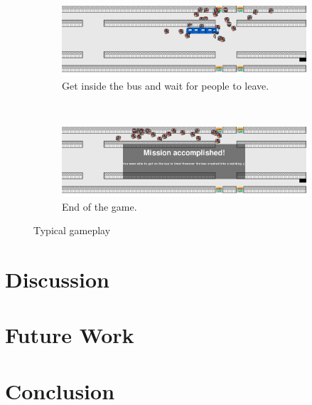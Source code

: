 \documentclass[a4paper,pdf,12pt]{article}
\begin{document}
\begin{figure}
        \begin{subfigure}[b]{0.4\textwidth}
                \centering
                \includegraphics[width=\textwidth]{../screenshots/screenshot_31108.png}
                \caption{Get inside the bus and wait for people to leave.}
                \label{fig:screenshot05}
        \end{subfigure}
        ~ %
        \begin{subfigure}[b]{0.4\textwidth}
                \centering
                \includegraphics[width=\textwidth]{../screenshots/screenshot_62502.png}
                \caption{End of the game.}
                \label{fig:screenshot06}
        \end{subfigure}

        \caption{Typical gameplay}\label{fig:gameplay}
\end{figure}

\section{Discussion}
\label{sec:Discussion}

\section{Future Work}
\label{sec:Future Work}

\section{Conclusion}
\label{sec:Conclusion}



\end{document}
